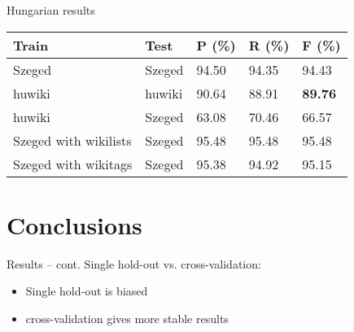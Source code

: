 \documentclass[utf8x]{beamer}
\newcommand{\vitem}{\vfill \item}
\begin{document}
\begin{frame}{Hungarian results}

\begin{center}
\begin{tabular}{lllll}
\hline \bf Train & \bf Test & \bf P (\%) & \bf R (\%) & \bf F (\%) \\ \hline
Szeged  & Szeged  & 94.50 & 94.35 & 94.43 \\
huwiki & huwiki & 90.64 & 88.91 &  \textbf{89.76} \\
huwiki & Szeged  & 63.08 & 70.46 & 66.57 \\
Szeged  with wikilists & Szeged  & 95.48 & 95.48 & 95.48 \\
Szeged  with wikitags & Szeged  & 95.38 & 94.92 & 95.15 \\
\hline
\end{tabular}
\end{center}


\end{frame}

\section{Conclusions}
\begin{frame}{Results -- cont.}
  Single hold-out vs. cross-validation:
  \begin{itemize}
  \vitem Single hold-out is biased
  \vitem cross-validation gives more stable results
  \end{itemize}
  \vfill
\end{frame}
\end{document}
